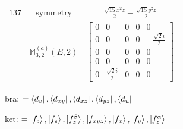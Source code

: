 \documentclass[fleqn,8pt,landscape]{jsarticle}
\begin{document}
\begin{longtable}{ccc}
$ 137 $ & $ \text{symmetry} $ & $ \frac{\sqrt{15} x^{2} z}{2} - \frac{\sqrt{15} y^{2} z}{2} $ \\
$  $ & $ \mathbb{M}_{3,2}^{(a)}(E,2) $ & $ \begin{bmatrix} 0 & 0 & 0 & 0 & 0 \\ 0 & 0 & 0 & 0 & - \frac{\sqrt{2} i}{2} \\ 0 & 0 & 0 & 0 & 0 \\ 0 & 0 & 0 & 0 & 0 \\ 0 & \frac{\sqrt{2} i}{2} & 0 & 0 & 0 \end{bmatrix} $ \\ \hline
\end{longtable}
bra: $=\bra{d_{v}}, \bra{d_{xy}}, \bra{d_{xz}}, \bra{d_{yz}}, \bra{d_{u}}$

\noindent
ket: $=\ket{f_{c}}, \ket{f_{s}}, \ket{f_{z}^{\beta}}, \ket{f_{xyz}}, \ket{f_{x}}, \ket{f_{y}}, \ket{f_{z}^{\alpha}}$
\renewcommand{\arraystretch}{1.6}
\end{document}
